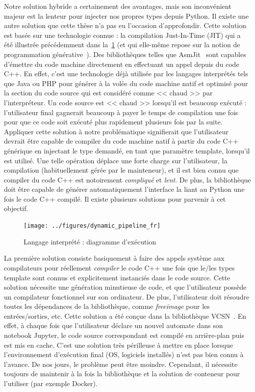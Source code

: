 Notre solution hybride a certainement des avantages, mais son inconvénient majeur est la lenteur pour injecter nos
propres types depuis Python. Il existe une autre solution que cette thèse n'a pas eu l'occasion d'approfondir. Cette
solution est basée sur une technologie connue : la compilation Just-In-Time (JIT) qui a été illustrée précédemment dans
la~\cref{resume:fig:static.dynamic.dynamic.pipeline} (et qui elle-même repose sur la notion de programmation
générative~\parencite{czarnecki.2000.generative}). Des bibliothèques telles que AsmJit~\parencite{kobalicek.2011.asmjit}
sont capables d'émettre du code machine directement en effectuant un appel depuis du code C++. En effet, c'est une
technologie déjà utilisée par les langages interprétés tels que Java ou PHP pour générer à la volée du code machine
natif et optimisé pour la section du code source qui est considéré comme << chaud >> par l'interpréteur. Un code source
est << chaud >> lorsqu'il est beaucoup exécuté : l'utilisateur final gagnerait beaucoup à payer le temps de compilation
une fois pour que ce code soit exécuté plus rapidement plusieurs fois par la suite. Appliquer cette solution à notre
problématique signifierait que l'utilisateur devrait être capable de compiler du code machine natif à partir du code C++
générique en injectant le type demandé, en tant que paramètre template, lorsqu'il est utilisé. Une telle opération
déplace une forte charge sur l'utilisateur, la compilation (habituellement gérée par le mainteneur), et il est bien
connu que compiler du code C++ est notoirement \emph{compliqué} et \emph{lent}. De plus, la bibliothèque doit être
capable de générer automatiquement l'interface la liant au Python une fois le code C++ compilé. Il existe plusieurs
solutions pour parvenir à cet objectif.

\begin{figure}[htbp]
  \centering
  \texttt{[image: ../figures/dynamic\_pipeline\_fr]}
  \caption{Langage interprété : diagramme d'exécution}
  \label{resume:fig:static.dynamic.dynamic.pipeline}
\end{figure}

La première solution consiste basiquement à faire des appels système aux compilateurs pour réellement \emph{compiler} le
code C++ une fois que le/les types template sont connus et explicitement instanciés dans le code source. Cette solution
nécessite une génération minutieuse de code, et que l'utilisateur possède un compilateur fonctionnel sur son ordinateur.
De plus, l'utilisateur doit résoudre toutes les dépendances de la bibliothèque, comme \emph{freeimage} pour les
entrées/sorties, etc. Cette solution a été conçue dans la bibliothèque VCSN~\parencite{demaille.2013.vcsn}. En effet, à
chaque fois que l'utilisateur déclare un nouvel automate dans son notebook Jupyter, le code source correspondant est
compilé en arrière-plan puis est mis en cache. C'est une solution très périlleuse à mettre en place lorsque
l'environnement d'exécution final (OS, logiciels installés) n'est pas bien connu à l'avance. De nos jours, le problème
peut être moindre. Cependant, il nécessite toujours de maintenir à la fois la bibliothèque et la solution de conteneur
pour l'utiliser (par exemple Docker).

